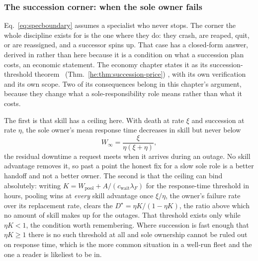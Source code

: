 \documentclass[11pt,a4paper]{article}
\theoremstyle{definition}
\theoremstyle{plain}
\begin{document}
\subsubsection{The succession corner: when the sole owner fails}\label{sec:succession-corner}

Eq.~\ref{eq:specboundary} assumes a specialist who never stops. The corner the
whole discipline exists for is the one where they do: they crash, are reaped,
quit, or are reassigned, and a successor spins up. That case has a
closed-form answer, derived in  rather than
here because it is a condition on what a succession plan costs, an economic
statement. The economy chapter states it as its succession-threshold theorem%
\ifpdbook
\ (Thm.~\ref{he:thm:succession-price})%
\fi
, with its own verification and its own scope. Two of its consequences belong in
this chapter's argument, because they change what a sole-responsibility role
means rather than what it costs.

The first is that skill has a ceiling here. With death at rate $\xi$ and
succession at rate $\eta$, the sole owner's mean response time decreases in
skill but never below
\[
W_\infty=\frac{\xi}{\eta(\xi+\eta)},
\]
the residual downtime a request meets when it arrives during an outage. No
skill advantage removes it, so past a point the honest fix for a slow sole role is
a better handoff and not a better owner. The second is that the ceiling can
bind absolutely: writing $K=W_{\mathrm{pool}}+A/(c_{\mathrm{wait}}\lambda_F)$ for the
response-time threshold in hours,
pooling wins at \emph{every} skill advantage once $\xi/\eta$, the owner's failure
rate over its replacement rate, clears the 
$D^\star=\eta K/(1-\eta K)$, the ratio above which no amount of skill makes up
for the outages. That threshold exists only while $\eta K<1$, the condition
worth remembering. Where succession is fast enough that
$\eta K\ge 1$ there is no such threshold at all and sole ownership cannot be
ruled out on response time, which is the more common situation in a
well-run fleet and the one a reader is likeliest to be in.
\end{document}
